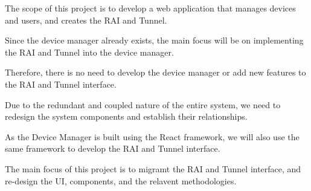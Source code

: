 



The scope of this project is to develop a web application 
that manages devices and users, and creates the RAI and Tunnel.

Since the device manager already exists, 
the main focus will be on implementing the RAI and Tunnel 
into the device manager.

Therefore, there is no need to develop the device manager 
or add new features to the RAI and Tunnel interface.

Due to the redundant and coupled nature of the entire system, 
we need to redesign the system components 
and establish their relationships.

As the Device Manager is built using the React framework, 
we will also use the same framework to develop the RAI and Tunnel interface.

The main focus of this project is to migramt the RAI and Tunnel interface, 
and re-design the UI, components, and the relavent methodologies.
